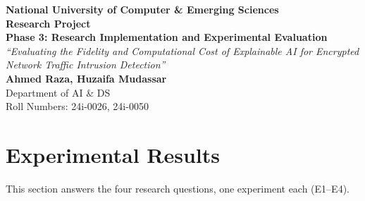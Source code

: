 



\begin{center}
  {\Large\bfseries National University of Computer \& Emerging Sciences}\\[6pt]
  {\large\bfseries Research Project}\\[6pt]
  {\Large\bfseries Phase 3: Research Implementation and Experimental Evaluation}\\[10pt]
  {\itshape ``Evaluating the Fidelity and Computational Cost of Explainable AI for Encrypted Network Traffic Intrusion Detection''}\\[12pt]
  {\bfseries Ahmed Raza, Huzaifa Mudassar}\\[2pt]
  Department of AI \& DS\\
  Roll Numbers: 24i-0026, 24i-0050
\end{center}

\vspace{8pt}


\FloatBarrier

\FloatBarrier


\FloatBarrier
\section{Experimental Results}
\label{sec:results}
This section answers the four research questions, one experiment each (E1--E4).










\FloatBarrier




